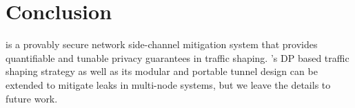 \vspace{-0.2cm}
\section{Conclusion}
\label{sec:conclusion}

{\sys} is a provably secure network side-channel mitigation system that provides
quantifiable and tunable privacy guarantees in traffic shaping.
{\sys}'s DP based traffic shaping strategy as well as its
modular and portable tunnel design can be extended to mitigate leaks
in multi-node systems, but we leave the details to future work.